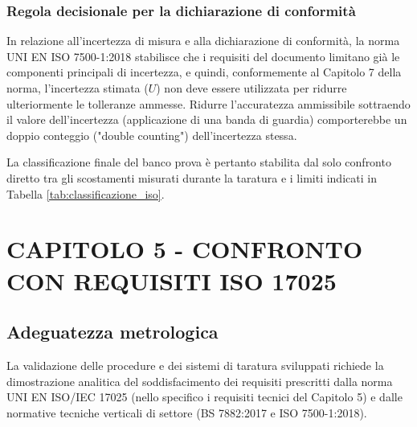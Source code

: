 \documentclass[a4paper, twoside]{article}
\begin{document}
\subsubsection{Regola decisionale per la dichiarazione di conformità}
In relazione all'incertezza di misura e alla dichiarazione di conformità, la norma UNI EN ISO 7500-1:2018 stabilisce che i requisiti del documento limitano già le componenti principali di incertezza, e quindi, conformemente al Capitolo 7 della norma, l'incertezza stimata ($U$) non deve essere utilizzata per ridurre ulteriormente le tolleranze ammesse. Ridurre l'accuratezza ammissibile sottraendo il valore dell'incertezza (applicazione di una banda di guardia) comporterebbe un doppio conteggio ("double counting") dell'incertezza stessa. 

La classificazione finale del banco prova è pertanto stabilita dal solo confronto diretto tra gli scostamenti misurati durante la taratura e i limiti indicati in Tabella \ref{tab:classificazione_iso}.



\section{CAPITOLO 5 - CONFRONTO CON REQUISITI ISO 17025}

\subsection{Adeguatezza metrologica}

La validazione delle procedure e dei sistemi di taratura sviluppati richiede la dimostrazione analitica del soddisfacimento dei requisiti prescritti dalla norma UNI EN ISO/IEC 17025 (nello specifico i requisiti tecnici del Capitolo 5) e dalle normative tecniche verticali di settore (BS 7882:2017 e ISO 7500-1:2018).
\end{document}
